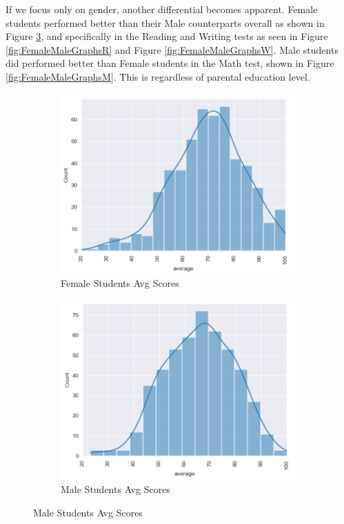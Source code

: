 \documentclass[man,floatsintext]{apa6} %
\begin{document}
If we focus only on gender, another differential becomes apparent. Female students performed better than their Male counterparts overall as shown in Figure \ref{fig:FemaleMaleAvgScores}, and specifically in the Reading and Writing tests as seen in Figure \ref{fig:FemaleMaleGraphsR} and Figure \ref{fig:FemaleMaleGraphsW}.  Male students did performed better than Female students in the Math test, shown in Figure \ref{fig:FemaleMaleGraphsM}. This is regardless of parental education level.
\begin{figure}[H]
    \centering
    \caption{Average Standardized Scores by Gender}
    \begin{subfigure}[b]{0.4\textwidth}
        \includegraphics[width=\linewidth]{FemaleAverageScoreCurve.png}
        \caption{Female Students Avg Scores}
        \label{fig:FemaleAvg}
    \end{subfigure}
    \begin{subfigure}[b]{0.4\textwidth}
        \includegraphics[width=\linewidth]{MaleAverageScoreCurve.png}
        \caption{Male Students Avg Scores}
        \label{fig:MaleAvg}
    \end{subfigure}
    \label{fig:FemaleMaleAvgScores}
\end{figure}
\end{document}
